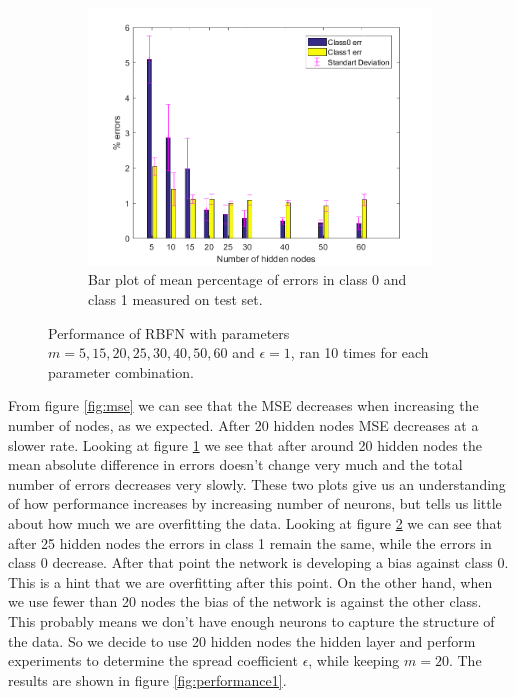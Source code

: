 \documentclass[a4paper, 11pt]{article}
\begin{document}
\begin{figure}[h!]
\begin{subfigure}[t]{0.32\textwidth}
        \label{fig:errorplot}
    \end{subfigure}
    \hfill %
    \begin{subfigure}[t]{0.32\textwidth}
        \includegraphics[width=\textwidth]{../figures/perf/errorbar_m(5-60)_e(10-10).png}
        \caption{Bar plot of mean percentage of errors in class 0 and class 1 measured on test set.}
        \label{fig:errorbar}
    \end{subfigure}
    \caption{Performance of RBFN with parameters $m = 5,15,20,25,30,40,50,60$ and $\epsilon = 1$, ran 10  times for each parameter combination.}\label{fig:performance}
\end{figure}

From figure \ref{fig:mse} we can see that the MSE decreases when increasing the number of nodes, as we expected. After 20 hidden nodes MSE decreases at a slower rate. Looking at figure \ref{fig:errorplot} we see that after around 20 hidden nodes the mean absolute difference in errors doesn't change very much and the total number of errors decreases very slowly. These two plots give us an understanding of how performance increases by increasing number of neurons, but tells us little about how much we are overfitting the data. Looking at figure \ref{fig:errorbar} we can see that after 25 hidden nodes the errors in class 1 remain the same, while the errors in class 0 decrease. After that point the network is developing a bias against class 0. This is a hint that we are overfitting after this point. On the other hand, when we use fewer than 20 nodes the bias of the network is against the other class. This probably means we don't have enough neurons to capture the structure of the data. So we decide to use 20 hidden nodes the hidden layer and perform experiments to determine the spread coefficient $\epsilon$, while keeping $m = 20$. The results are shown in figure \ref{fig:performance1}.
\end{document}
